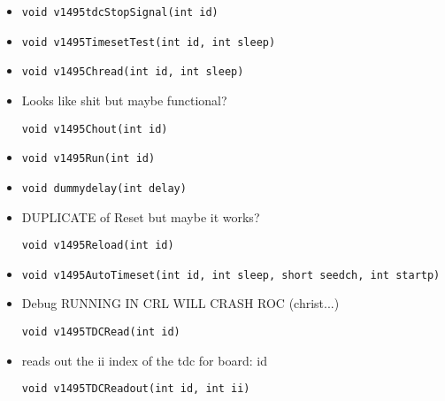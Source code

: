 \documentclass[11pt]{article}
\begin{document}
\begin{itemize}
		\item
			\begin{lstlisting}
void v1495tdcStopSignal(int id)			
			\end{lstlisting}
			
		\item
			\begin{lstlisting}
void v1495TimesetTest(int id, int sleep)			
			\end{lstlisting}

		\item
			\begin{lstlisting}
void v1495Chread(int id, int sleep)			
			\end{lstlisting}
		
		\item Looks like shit but maybe functional?
			\begin{lstlisting}
void v1495Chout(int id)
			\end{lstlisting}						

		\item
			\begin{lstlisting}
void v1495Run(int id)
			\end{lstlisting}
			
		\item
			\begin{lstlisting}
void dummydelay(int delay)			
			\end{lstlisting}
			
		\item DUPLICATE of Reset but maybe it works? 
			\begin{lstlisting}
void v1495Reload(int id)			
			\end{lstlisting}
			
		\item
			\begin{lstlisting}
void v1495AutoTimeset(int id, int sleep, short seedch, int startp)			
			\end{lstlisting}
			
		\item Debug RUNNING IN CRL WILL CRASH ROC (christ...)
			\begin{lstlisting}
void v1495TDCRead(int id)			
			\end{lstlisting}

		\item reads out the ii index of the tdc for board: id
			\begin{lstlisting}
void v1495TDCReadout(int id, int ii)			
			\end{lstlisting}
			

\end{itemize}
\end{document}
